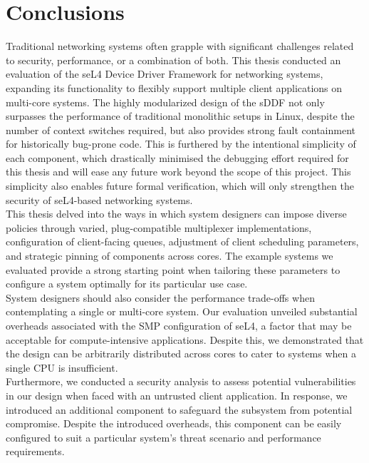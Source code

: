 \chapter{Conclusions}\label{ch:conclusion}

Traditional networking systems often grapple with significant challenges related to security, performance, or a 
combination of both. This thesis conducted an evaluation of the seL4 Device Driver Framework for networking systems,
expanding its functionality to flexibly support multiple client applications on multi-core systems. The highly
modularized design of the sDDF not only surpasses the performance of traditional monolithic setups in Linux,
despite the number of context switches required, but also provides strong fault containment for historically
bug-prone code. This is furthered by the intentional simplicity of each component, which drastically minimised 
the debugging effort required for this thesis and will ease any future work beyond the scope of this project. This simplicity
also enables future formal verification, which will only strengthen the security of seL4-based networking systems. \\

This thesis delved into the ways in
which system designers can impose diverse policies through varied, plug-compatible multiplexer implementations,
configuration of client-facing queues, adjustment of client scheduling parameters, and strategic pinning of
components across cores. The example systems we evaluated provide a strong starting point when tailoring these
parameters to configure a system optimally for its particular use case. \\

System designers should also consider the
performance trade-offs when contemplating a single or multi-core system. Our evaluation unveiled substantial
overheads associated with the SMP configuration of seL4, a factor that may be acceptable for compute-intensive
applications. Despite this, we demonstrated that the design can be arbitrarily distributed across cores to cater
to systems when a single CPU is insufficient. \\

Furthermore, we conducted a security analysis to assess potential
vulnerabilities in our design when faced with an untrusted client application. In response, we introduced an
additional component to safeguard the subsystem from potential compromise. Despite the introduced overheads,
this component can be easily configured to suit a particular system's threat scenario and performance
requirements. \\

